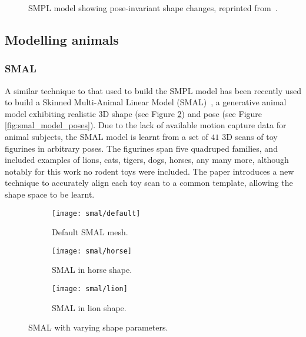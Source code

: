 \begin{figure}[H] %
    \caption{SMPL model showing pose-invariant shape changes, reprinted from~\cite{loper15smpl}.}
    \label{fig:smpl_model}
\end{figure}

\subsection{Modelling animals}

\subsubsection{SMAL}
A similar technique to that used to build the SMPL model has been recently used to build a Skinned Multi-Animal Linear Model (SMAL)~\cite{zuffi2017menagerie}, a generative animal model exhibiting realistic 3D shape (see Figure \ref{fig:smal_model_shape}) and pose (see Figure \ref{fig:smal_model_poses}). Due to the lack of available motion capture data for animal subjects, the SMAL model is learnt from a set of $41$ 3D scans of toy figurines in arbitrary poses. The figurines span five quadruped families, and included examples of lions, cats, tigers, dogs, horses, any many more, although notably for this work no rodent toys were included. The paper introduces a new technique to accurately align each toy scan to a common template, allowing the shape space to be learnt.

\begin{figure}[H]
    \centering
    \begin{subfigure}{0.3\linewidth}
    \centering
        \texttt{[image: smal/default]}
        \caption{Default SMAL mesh.}
    \end{subfigure}%
    \begin{subfigure}{0.3\linewidth}
    \centering
        \texttt{[image: smal/horse]}
        \caption{SMAL in horse shape.}
    \end{subfigure}%
    \begin{subfigure}{0.3\linewidth}
        \centering
            \texttt{[image: smal/lion]}
            \caption{SMAL in lion shape.}
    \end{subfigure}%
    \caption{SMAL with varying shape parameters.}
    \label{fig:smal_model_shape}
    \end{figure}

